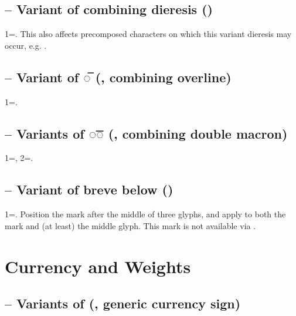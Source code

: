 \subsection{ -- Variant of combining dieresis ()}
1=. This also affects precomposed characters on which this variant dieresis may occur, e.g.
.

\subsection{ -- Variant of ◌̅ (,
combining overline)}
1=.

\subsection{ -- Variants of ◌͞◌ (, combining double macron)}
1=, 2=.

\subsection{ -- Variant of breve
below ()}
1=. Position the mark after the middle of three glyphs, and apply 
to both the mark and (at least) the middle glyph. This mark is not available via .

\section{Currency and Weights}
\subsection{ -- Variants of {\textcurrency} (, generic
currency sign)}

